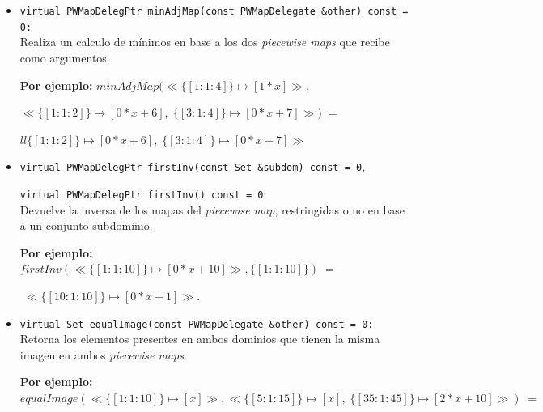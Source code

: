 \begin{itemize}

    \item \texttt{virtual PWMapDelegPtr minAdjMap(const PWMapDelegate \&other) const = 0:}\\
    Realiza un calculo de mínimos en base a los dos \textit{piecewise maps} que recibe como argumentos.

            \begin{center}
        \textbf{Por ejemplo:} $minAdjMap(\ll\{[1:1:4]\} \mapsto [1*x]\gg,$

        $\ll\{[1:1:2]\} \mapsto [0*x+6],\; \{[3:1:4]\} \mapsto [0*x+7]\gg)\; = $

        $ll\{[1:1:2]\} \mapsto [0*x+6],\; \{[3:1:4]\} \mapsto [0*x+7]\gg$
    \end{center}

    \item \texttt{virtual PWMapDelegPtr firstInv(const Set \&subdom) const = 0}, \par \texttt{virtual PWMapDelegPtr firstInv() const = 0}:\\
    Devuelve la inversa de los mapas del \textit{piecewise map}, restringidas o no en base a un conjunto subdominio.

    \begin{center}
        \textbf{Por ejemplo:} $firstInv(\ll\{[1:1:10]\} \mapsto [0*x+10]\gg, \{[1:1:10]\})\;=$
        
        $\;\ll\{[10:1:10]\} \mapsto [0*x+1] \gg.$
    \end{center}

    

    \item \texttt{virtual Set equalImage(const PWMapDelegate \&other) const = 0:} \\
    Retorna los elementos presentes en ambos dominios que tienen la misma imagen en ambos \textit{piecewise maps}.

            \begin{center}
        \textbf{Por ejemplo:} $equalImage(\ll\{[1:1:10]\} \mapsto [x]\gg, \ll\{[5:1:15]\} \mapsto [x],\; \{[35:1:45]\} \mapsto [2*x+10]\gg)\;=$
        

\end{center}
\end{itemize}
